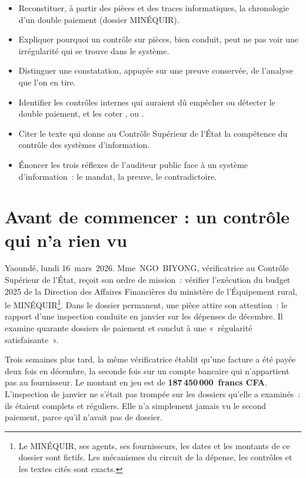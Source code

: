 \begin{boxobjectifs}
\begin{itemize}
    \item Reconstituer, à partir des pièces et des traces informatiques, la
          chronologie d'un double paiement (dossier MINÉQUIR).
    \item Expliquer pourquoi un contrôle sur pièces, bien conduit, peut ne
          pas voir une irrégularité qui se trouve dans le système.
    \item Distinguer une constatation, appuyée sur une preuve conservée, de
          l'analyse que l'on en tire.
    \item Identifier les contrôles internes qui auraient dû empêcher ou
          détecter le double paiement, et les coter \OUI{}, \NON{} ou
          \NEK{}.
    \item Citer le texte qui donne au Contrôle Supérieur de l'État la
          compétence du contrôle des systèmes d'information.
    \item Énoncer les trois réflexes de l'auditeur public face à un système
          d'information~: le mandat, la preuve, le contradictoire.
\end{itemize}
\end{boxobjectifs}

\bigskip

\section*{Avant de commencer : un contrôle qui n'a rien vu}

Yaoundé, lundi 16~mars~2026. Mme~NGO~BIYONG, vérificatrice au Contrôle
Supérieur de l'État, reçoit son ordre de mission~: vérifier l'exécution du
budget 2025 de la Direction des Affaires Financières du ministère de
l'Équipement rural, le MINÉQUIR\footnote{Le MINÉQUIR, ses agents, ses
fournisseurs, les dates et les montants de ce dossier sont fictifs. Les
mécanismes du circuit de la dépense, les contrôles et les textes cités sont
exacts.}. Dans le dossier permanent, une pièce attire son attention~: le
rapport d'une inspection conduite en janvier sur les dépenses de décembre.
Il examine quarante dossiers de paiement et conclut à une «~régularité
satisfaisante~».

Trois semaines plus tard, la même vérificatrice établit qu'une facture a
été payée deux fois en décembre, la seconde fois sur un compte bancaire qui
n'appartient pas au fournisseur. Le montant en jeu est de
\textbf{187\,450\,000~francs CFA}.
L'inspection de janvier ne s'était pas trompée sur les dossiers qu'elle a
examinés~: ils étaient complets et réguliers. Elle n'a simplement jamais vu
le second paiement, parce qu'il n'avait pas de dossier.

